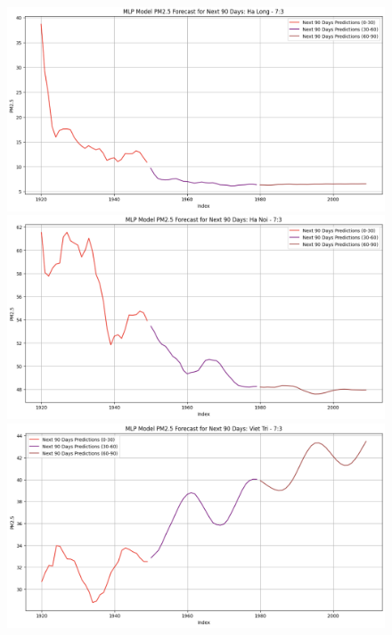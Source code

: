 
\begin{figure}[H]

    \begin{minipage}{0.15\textwidth}
        \centering
        \includegraphics[width=1\textwidth]{img/final/MLP/90D/MLP_7_3_HL_90D.png}
        \end{minipage}
        \hfill
        \begin{minipage}{0.15\textwidth}
        \centering
        \includegraphics[width=1\textwidth]{img/final/MLP/90D/MLP_7_3_HN_90D.png}
        \end{minipage}
        \hfill
        \begin{minipage}{0.15\textwidth}
        \centering
        \includegraphics[width=1\textwidth]{img/final/MLP/90D/MLP_7_3_VT_90D.png}
        \end{minipage}
        \hfill


\end{figure}
